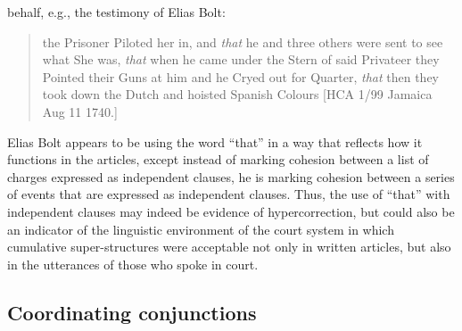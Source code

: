 behalf, e.g., the testimony of Elias Bolt:

\begin{quotation}
the Prisoner Piloted her in, and \textit{that} he and three others were sent to see what She was, \textit{that} when he came under the Stern of said Privateer they Pointed their Guns at him and he Cryed out for Quarter, \textit{that} then they took down the Dutch and hoisted Spanish Colours [HCA 1/99 Jamaica Aug 11 1740.]\end{quotation}

Elias Bolt appears to be using the word “that” in a way that reflects how it functions in the articles, except instead of marking cohesion between a list of charges expressed as independent clauses, he is marking cohesion between a series of events that are expressed as independent clauses. Thus, the use of “that” with independent clauses may indeed be evidence of hypercorrection, but could also be an indicator of the linguistic environment of the court system in which cumulative super-structures were acceptable not only in written articles, but also in the utterances of those who spoke in court. 

\subsection{{Coordinating} {conjunctions} }%

